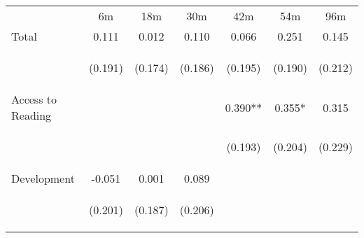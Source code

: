 \begin{tabular}{lcccccc}
\hline \noalign{\smallskip} & 6m & 18m & 30m & 42m & 54m & 96m\\
\noalign{\smallskip}\hline \noalign{\smallskip}Total & 0.111 & 0.012 & 0.110 & 0.066 & 0.251 & 0.145\\
 & \begin{footnotesize}(0.191)\end{footnotesize} & \begin{footnotesize}(0.174)\end{footnotesize} & \begin{footnotesize}(0.186)\end{footnotesize} & \begin{footnotesize}(0.195)\end{footnotesize} & \begin{footnotesize}(0.190)\end{footnotesize} & \begin{footnotesize}(0.212)\end{footnotesize}\\
\noalign{\smallskip}Access to Reading &  &  &  & 0.390** & 0.355* & 0.315\\
 & \begin{footnotesize}\end{footnotesize} & \begin{footnotesize}\end{footnotesize} & \begin{footnotesize}\end{footnotesize} & \begin{footnotesize}(0.193)\end{footnotesize} & \begin{footnotesize}(0.204)\end{footnotesize} & \begin{footnotesize}(0.229)\end{footnotesize}\\
\noalign{\smallskip}Development & -0.051 & 0.001 & 0.089 &  &  & \\
 & \begin{footnotesize}(0.201)\end{footnotesize} & \begin{footnotesize}(0.187)\end{footnotesize} & \begin{footnotesize}(0.206)\end{footnotesize} & \begin{footnotesize}\end{footnotesize} & \begin{footnotesize}\end{footnotesize} & \begin{footnotesize}\end{footnotesize}\\

\end{tabular}

